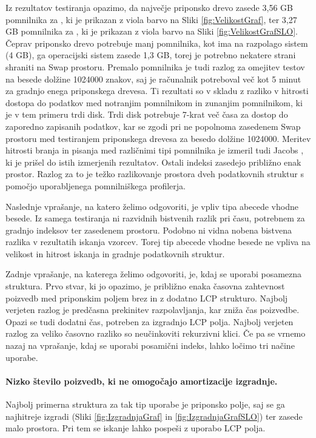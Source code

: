 Iz rezultatov testiranja opazimo, da največje priponsko drevo zasede 3,56 GB pomnilnika za \DNK, ki je prikazan z viola barvo na Sliki \ref{fig:VelikostGraf}, ter 3,27 GB pomnilnika za \NK, ki je prikazan z viola barvo na Sliki \ref{fig:VelikostGrafSLO}. Čeprav priponsko drevo potrebuje manj pomnilnika, kot ima na razpolago sistem (4 GB), ga operacijski sistem zasede 1,3 GB, torej je potrebno nekatere strani shraniti na Swap prostoru. Premalo pomnilnika je tudi razlog za omejitev testov na besede dolžine 1024000 znakov, saj je računalnik potreboval več kot 5 minut za gradnjo enega priponskega drevesa. Ti rezultati so v skladu z razliko v hitrosti dostopa do podatkov med notranjim pomnilnikom in zunanjim pomnilnikom, ki je v tem primeru trdi disk. Trdi disk potrebuje 7-krat več časa za dostop do zaporedno zapisanih podatkov, kar se zgodi pri ne popolnoma zasedenem Swap prostoru med testiranjem priponskega drevesa za besedo dolžine 1024000. Meritev hitrosti branja in pisanja med različnimi tipi pomnilnika je izmeril tudi Jacobs \cite{Jacobs2009}, ki je prišel do istih izmerjenih rezultatov. Ostali indeksi zasedejo približno enak prostor. Razlog za to je težko razlikovanje prostora dveh podatkovnih struktur s pomočjo uporabljenega pomnilniškega profilerja.

Naslednje vprašanje, na katero želimo odgovoriti, je vpliv tipa abecede vhodne besede. Iz samega testiranja ni razvidnih bistvenih razlik pri času, potrebnem za gradnjo indeksov ter zasedenem prostoru. Podobno ni vidna nobena bistvena razlika v rezultatih iskanja vzorcev. Torej tip abecede vhodne besede ne vpliva na velikost in hitrost iskanja in gradnje podatkovnih struktur.

Zadnje vprašanje, na katerega želimo odgovoriti, je, kdaj se uporabi posamezna struktura. Prvo stvar, ki jo opazimo, je približno enaka časovna zahtevnost poizvedb med priponskim poljem brez in z dodatno LCP strukturo. Najbolj verjeten razlog je predčasna prekinitev razpolavljanja, kar zniža čas poizvedbe. Opazi se tudi dodatni čas, potreben za izgradnjo LCP polja. Najbolj verjeten razlog za veliko časovno razliko so neučinkoviti rekurzivni klici. Če pa se vrnemo nazaj na vprašanje, kdaj se uporabi posamični indeks, lahko ločimo tri načine uporabe. 
\paragraph{Nizko število poizvedb, ki ne omogočajo amortizacije izgradnje.} 
Najbolj primerna struktura za tak tip uporabe je priponsko polje, saj se ga najhitreje izgradi (Sliki \ref{fig:IzgradnjaGraf} in \ref{fig:IzgradnjaGrafSLO}) ter zasede malo prostora. Pri tem se iskanje lahko pospeši z uporabo LCP polja. 

